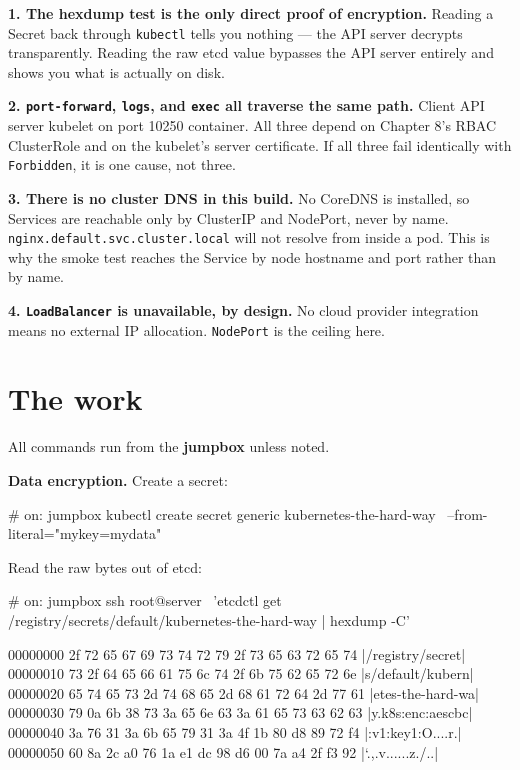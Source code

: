 \documentclass[11pt,oneside]{report}
\begin{document}
\textbf{1. The
hexdump test is the
only direct proof of
encryption.} Reading
a Secret back
through
\texttt{kubectl}
tells you nothing
--- the API server
decrypts
transparently.
Reading the raw etcd
value bypasses the
API server entirely
and shows you what
is actually on disk.

\textbf{2.
\texttt{port-forward},
\texttt{logs}, and
\texttt{exec} all
traverse the same
path.} Client
\textrightarrow{}
API server
\textrightarrow{}
kubelet on port
10250
\textrightarrow{}
container. All three
depend on Chapter
8's RBAC ClusterRole
and on the kubelet's
server certificate.
If all three fail
identically with
\texttt{Forbidden},
it is one cause, not
three.

\textbf{3. There is
no cluster DNS in
this build.} No
CoreDNS is
installed, so
Services are
reachable only by
ClusterIP and
NodePort, never by
name.
\texttt{nginx.}\allowbreak{}\texttt{default.}\allowbreak{}\texttt{svc.}\allowbreak{}\texttt{cluster.}\allowbreak{}\texttt{local}
will not resolve
from inside a pod.
This is why the
smoke test reaches
the Service by node
hostname and port
rather than by name.

\textbf{4.
\texttt{LoadBalancer}
is unavailable, by
design.} No cloud
provider integration
means no external IP
allocation.
\texttt{NodePort} is
the ceiling here.

\hypertarget{the-work-11}{%
\section{The
work}\label{the-work-11}}

All commands run
from the
\textbf{jumpbox}
unless noted.

\textbf{Data
encryption.} Create
a secret:

\begin{cmdlst}
# on: jumpbox
kubectl create secret generic kubernetes-the-hard-way \
  --from-literal="mykey=mydata"
\end{cmdlst}

Read the raw bytes
out of etcd:

\begin{cmdlst}
# on: jumpbox
ssh root@server \
    'etcdctl get /registry/secrets/default/kubernetes-the-hard-way | hexdump -C'
\end{cmdlst}

\begin{outlst}
00000000  2f 72 65 67 69 73 74 72  79 2f 73 65 63 72 65 74  |/registry/secret|
00000010  73 2f 64 65 66 61 75 6c  74 2f 6b 75 62 65 72 6e  |s/default/kubern|
00000020  65 74 65 73 2d 74 68 65  2d 68 61 72 64 2d 77 61  |etes-the-hard-wa|
00000030  79 0a 6b 38 73 3a 65 6e  63 3a 61 65 73 63 62 63  |y.k8s:enc:aescbc|
00000040  3a 76 31 3a 6b 65 79 31  3a 4f 1b 80 d8 89 72 f4  |:v1:key1:O....r.|
00000050  60 8a 2c a0 76 1a e1 dc  98 d6 00 7a a4 2f f3 92  |`.,.v......z./..|
\end{outlst}
\end{document}
